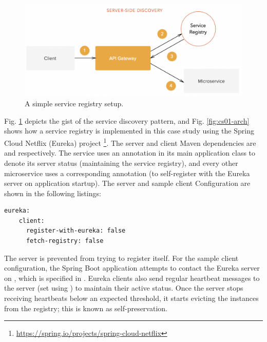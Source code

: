 \begin{figure}[H]
  \centering
  \includegraphics[width=0.7\linewidth]{./assets/images/case-studies/server-side-discovery.png}
  \caption{A simple service registry setup.}
  \label{fig:server-side-discovery}
\end{figure}

Fig. \ref{fig:server-side-discovery} depicts the gist of the service discovery pattern, and Fig. \ref{fig:cs01-arch} shows how a service registry is implemented in this case study using the Spring Cloud Netflix (Eureka) project \footnote{\url{https://spring.io/projects/spring-cloud-netflix}}. The server and client Maven dependencies are  and  respectively. The  service uses an  annotation in its main application class to denote its server status (maintaining the service registry), and every other microservice uses a corresponding  annotation (to self-register with the Eureka server on application startup). The server and sample client Configuration are shown in the following listings:

\begin{lstlisting}[caption=Snippet from Eureka server's application properties]
  eureka:
    client:
      register-with-eureka: false
      fetch-registry: false
\end{lstlisting}

The server is prevented from trying to register itself. For the sample client configuration, the Spring Boot application attempts to contact the Eureka server on , which is specified in . Eureka clients also send regular heartbeat messages to the server (set using ) to maintain their active status. Once the server stops receiving heartbeats below an expected threshold, it starts evicting the instances from the registry; this is known as self-preservation.

